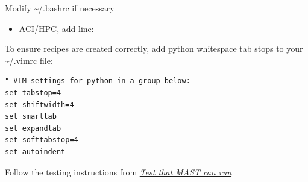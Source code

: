 \documentclass[letterpaper,10pt,english]{sphinxmanual}
\begin{document}
Modify \textasciitilde{}/.bashrc if necessary
\begin{itemize}
\item {} 
ACI/HPC, add line: 

\end{itemize}

To ensure recipes are created correctly, add python whitespace tab stops to your \textasciitilde{}/.vimrc file:

\begin{Verbatim}[commandchars=\\\{\}]
" VIM settings for python in a group below:
set tabstop=4
set shiftwidth=4
set smarttab
set expandtab
set softtabstop=4
set autoindent
\end{Verbatim}

Follow the testing instructions from {\hyperref[1_0_installation:test-on-cluster]{\emph{Test that MAST can run}}}
\end{document}
